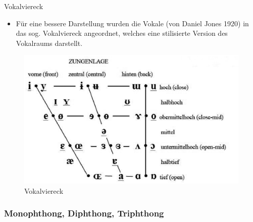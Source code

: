 \begin{frame}{Vokalviereck}

	\begin{itemize}
		\item Für eine bessere Darstellung wurden die Vokale (von Daniel Jones 1920) in das sog. Vokalviereck angeordnet, welches eine stilisierte Version des Vokalraums darstellt.
	\end{itemize}

	\begin{figure}[H]
		\centering
		
		\includegraphics[scale=0.37]{material/04ipatabellerepp11vokalviereck} %
		\caption{Vokalviereck \citep{Repp&Co12a}}
	\end{figure}	
	
\end{frame}


%
\subsubsection{Monophthong, Diphthong, Triphthong}

